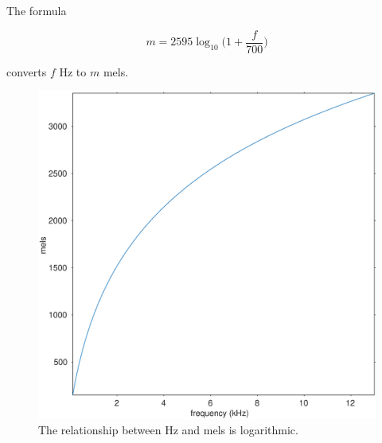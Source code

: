 \documentclass[journal]{IEEEtran}
\begin{document}
The formula

\begin{equation}
  m = 2595 \log_{10} \bigg( 1 + \frac{f}{700} \bigg)
\end{equation}

converts $f$ Hz to $m$ mels.

\begin{figure}[h]
	\centering
	\includegraphics[width=\linewidth]{gfx/hz2mel.eps}
	\caption{The relationship between Hz and mels is logarithmic.}
	\label{fig:hz2mel}
\end{figure}
\end{document}

